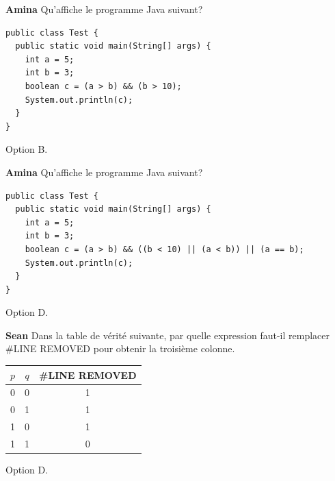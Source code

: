 \begin{Exercice}[10 minutes]\textbf{Amina}
Qu'affiche le programme Java suivant?

\begin{lstlisting}[style=javastyle]
public class Test {
  public static void main(String[] args) {
    int a = 5;
    int b = 3;
    boolean c = (a > b) && (b > 10);
    System.out.println(c);
  }
}
\end{lstlisting}


\begin{solution}
Option B. 
\end{solution}

\end{Exercice}


\begin{Exercice}[10 minutes]\textbf{Amina}
Qu'affiche le programme Java suivant?
\begin{lstlisting}[style=javastyle]
public class Test {
  public static void main(String[] args) {
    int a = 5;
    int b = 3;
    boolean c = (a > b) && ((b < 10) || (a < b)) || (a == b);
    System.out.println(c);
  }
}
\end{lstlisting}

\begin{solution}
Option D. 
\end{solution}
\end{Exercice}

\begin{Exercice}[10 minutes]\textbf{Sean}
    Dans la table de vérité suivante, par quelle expression faut-il remplacer \#LINE REMOVED pour obtenir la troisième colonne. 
    
    \begin{center}
        \begin{tabular}{|c|c|c|}
            \hline
            $p$ & $q$ & \#LINE REMOVED \\
            \hline
            0 & 0 & 1 \\
            \hline
            0 & 1 & 1 \\
            \hline
            1 & 0 & 1 \\
            \hline
            1 & 1 & 0 \\
            \hline
        \end{tabular}
    \end{center}


\begin{solution}
Option D.
\end{solution}
\end{Exercice}


